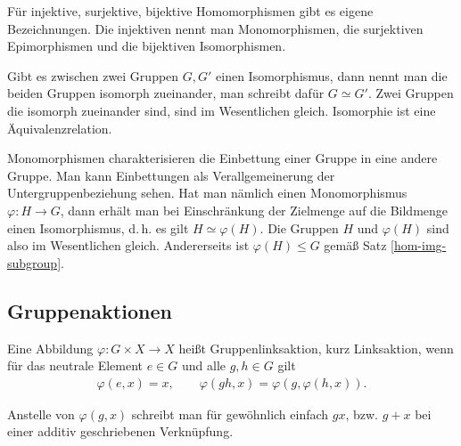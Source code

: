 Für injektive, surjektive, bijektive Homomorphismen gibt es
eigene Bezeichnungen. Die injektiven nennt man Monomorphismen,
die surjektiven Epimorphismen und die bijektiven Isomorphismen.

Gibt es zwischen zwei Gruppen $G,G'$ einen Isomorphismus, dann nennt
man die beiden Gruppen isomorph zueinander, man schreibt dafür
$G\simeq G'$. Zwei Gruppen die isomorph zueinander sind, sind
im Wesentlichen gleich. Isomorphie ist eine Äquivalenzrelation.

Monomorphismen charakterisieren die Einbettung einer Gruppe
in eine andere Gruppe. Man kann Einbettungen als Verallgemeinerung
der Untergruppenbeziehung sehen. Hat man nämlich einen Monomorphismus
$\varphi\colon H\to G$, dann erhält man bei Einschränkung der
Zielmenge auf die Bildmenge einen Isomorphismus, d.\,h. es gilt
$H\simeq\varphi(H)$. Die Gruppen $H$ und $\varphi(H)$ sind also im
Wesentlichen gleich. Andererseits ist $\varphi(H)\le G$ gemäß Satz
\ref{hom-img-subgroup}.

\subsection{Gruppenaktionen}

\begin{Definition}[Linksaktion]\newlinefirst
Eine Abbildung $\varphi\colon G\times X\to X$ heißt Gruppenlinksaktion,
kurz Linksaktion, wenn für das neutrale Element $e\in G$ und alle
$g,h\in G$ gilt
\begin{gather*}
\varphi(e,x) = x,\qquad \varphi(gh,x) = \varphi(g,\varphi(h,x)).
\end{gather*}
\end{Definition}
Anstelle von $\varphi(g,x)$ schreibt man für gewöhnlich einfach $gx$,
bzw. $g+x$ bei einer additiv geschriebenen Verknüpfung.

